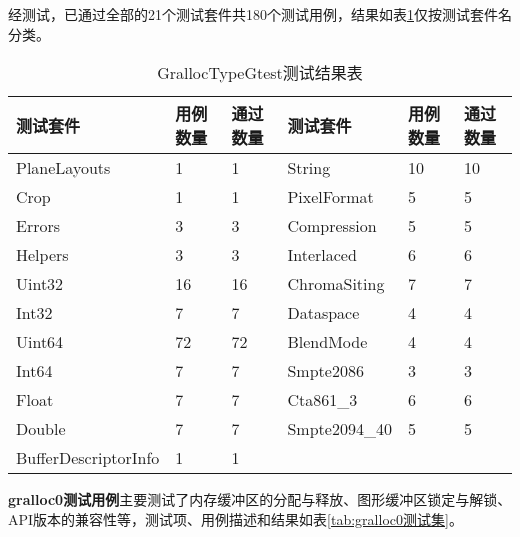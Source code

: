 经测试，已通过全部的21个测试套件共180个测试用例，结果如表\ref{tab:GrallocTypeGtest测试结果表}仅按测试套件名分类。

\begin{table}[H]
    \centering
    \caption{GrallocTypeGtest测试结果表}
    \label{tab:GrallocTypeGtest测试结果表}
    \begin{tabular}{llllll}
      \toprule
      测试套件 & 用例数量 &通过数量 & 测试套件 & 用例数量 &通过数量\\
      \midrule
      PlaneLayouts & 1 & 1 & String & 10 & 10 \\
      Crop & 1 & 1 & PixelFormat & 5 & 5 \\
      Errors & 3 & 3 & Compression & 5 & 5 \\
      Helpers & 3 & 3 & Interlaced & 6 & 6 \\
      Uint32 & 16 & 16 & ChromaSiting & 7 & 7 \\
      Int32 & 7 & 7 & Dataspace & 4 & 4 \\
      Uint64 & 72 & 72 & BlendMode & 4 & 4 \\
      Int64 & 7 & 7 & Smpte2086 & 3 & 3 \\
      Float & 7 & 7 & Cta861\_3 & 6 & 6 \\
      Double & 7 & 7 & Smpte2094\_40 & 5 & 5 \\
      BufferDescriptorInfo & 1 & 1 \\
      \bottomrule
    \end{tabular}
    \note{}
\end{table}


\textbf{gralloc0测试用例}主要测试了内存缓冲区的分配与释放、图形缓冲区锁定与解锁、API版本的兼容性等，测试项、用例描述和结果如表\ref{tab:gralloc0测试集}。


